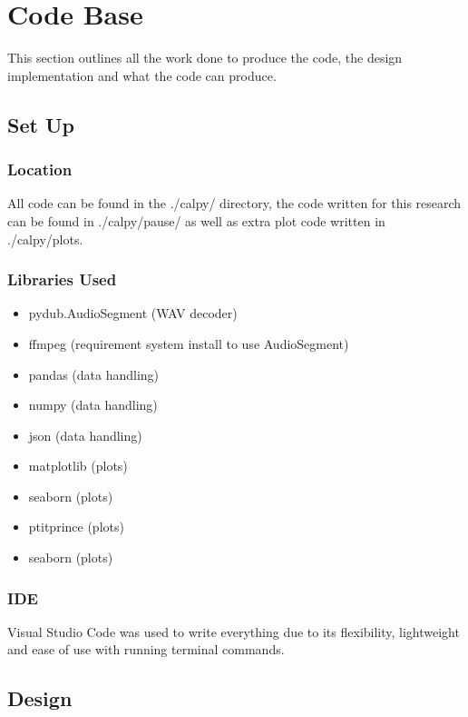 \section{Code Base}
This section outlines all the work done to produce the code, the design implementation and what the code can produce. 



\subsection{Set Up}
\subsubsection{Location}
All code can be found in the ./calpy/ directory, the code written for this research can be found in ./calpy/pause/ as well as extra plot code written in ./calpy/plots.

\subsubsection{Libraries Used}
\begin{itemize}
\item pydub.AudioSegment (WAV decoder) 
\item ffmpeg (requirement system install to use AudioSegment)
\item pandas (data handling)
\item numpy (data handling)
\item json (data handling)
\item matplotlib (plots)
\item seaborn (plots)
\item ptitprince (plots)
\item seaborn (plots)
\end{itemize}


\subsubsection{IDE}
Visual Studio Code was used to write everything due to its flexibility, lightweight and ease of use with running terminal commands.

 
\subsection{Design}
